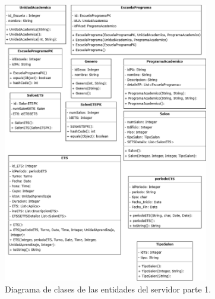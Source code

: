 \begin{figure}[htbp!]
	\begin{center}
		\includegraphics[width=0.8\textwidth]{Clases/EntidadesP1.png}
		\caption{Diagrama de clases de las entidades del servidor parte 1.}
		\label{fig:DE1}
	\end{center}
\end{figure}


